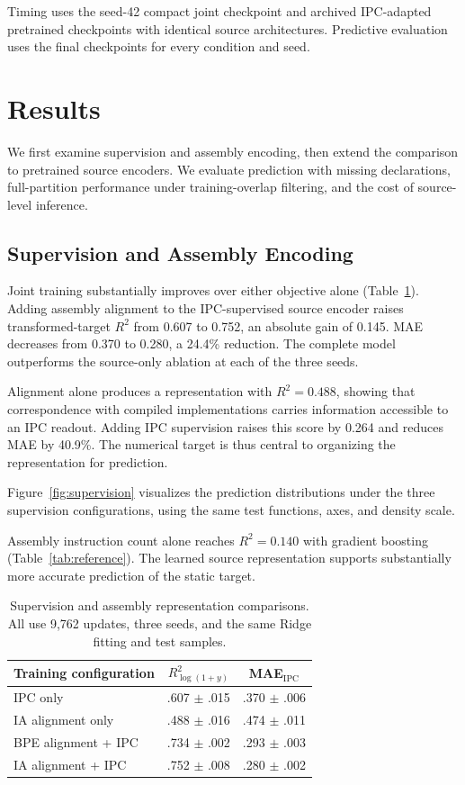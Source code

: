 \documentclass[conference]{IEEEtran}
\newenvironment{newtext}{\begingroup}{\endgroup}
\newcommand{\Rsq}{R^{2}}
\begin{document}
Timing uses the seed-42 compact joint checkpoint and archived IPC-adapted pretrained checkpoints with identical source architectures. Predictive evaluation uses the final checkpoints for every condition and seed.

\section{Results}
We first examine supervision and assembly encoding, then extend the comparison to pretrained source encoders. We evaluate prediction with missing declarations, full-partition performance under training-overlap filtering, and the cost of source-level inference.

\subsection{Supervision and Assembly Encoding}
Joint training substantially improves over either objective alone (Table~\ref{tab:supervision}). Adding assembly alignment to the IPC-supervised source encoder raises transformed-target $\Rsq$ from 0.607 to 0.752, an absolute gain of 0.145. MAE decreases from 0.370 to 0.280, a 24.4\% reduction. The complete model outperforms the source-only ablation at each of the three seeds.

Alignment alone produces a representation with $\Rsq=0.488$, showing that correspondence with compiled implementations carries information accessible to an IPC readout. Adding IPC supervision raises this score by 0.264 and reduces MAE by 40.9\%. The numerical target is thus central to organizing the representation for prediction.

Figure~\ref{fig:supervision} visualizes the prediction distributions under the three supervision configurations, using the same test functions, axes, and density scale.

\begin{newtext}
Assembly instruction count alone reaches $\Rsq=0.140$ with gradient boosting (Table~\ref{tab:reference}). The learned source representation supports substantially more accurate prediction of the static target.
\end{newtext}

\begin{table}[t]
\caption{Supervision and assembly representation comparisons. All use 9,762 updates, three seeds, and the same Ridge fitting and test samples.}
\label{tab:supervision}
\centering\small
\begin{tabular}{lcc}
\toprule
Training configuration & $\Rsq_{\log(1+y)}$ & MAE$_{\mathrm{IPC}}$\\
\midrule
IPC only & .607 $\pm$ .015 & .370 $\pm$ .006\\
IA alignment only & .488 $\pm$ .016 & .474 $\pm$ .011\\
BPE alignment + IPC & .734 $\pm$ .002 & .293 $\pm$ .003\\
IA alignment + IPC & .752 $\pm$ .008 & .280 $\pm$ .002\\
\bottomrule
\end{tabular}
\end{table}
\end{document}
